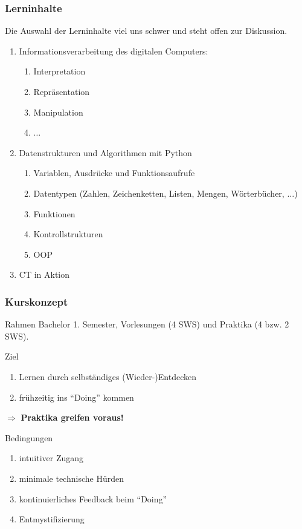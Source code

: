 \documentclass[german,aspectratio=169]{beamer}
\begin{document}
\begin{frame}
	\frametitle{Lerninhalte}
	Die Auswahl der Lerninhalte viel uns schwer und steht offen zur Diskussion.
	\begin{enumerate}[label=(\arabic*)]
		\item Informationsverarbeitung des digitalen Computers: 
		\begin{enumerate}[label=$\bullet$]
			\item Interpretation
			\item Repräsentation
			\item Manipulation
			\item $\ldots$
		\end{enumerate}
		\item Datenstrukturen und Algorithmen mit Python
			\begin{enumerate}[label=$\bullet$]
			\item Variablen, Ausdrücke und Funktionsaufrufe
			\item Datentypen (Zahlen, Zeichenketten, Listen, Mengen, Wörterbücher, $\ldots$)
			\item Funktionen
			\item Kontrollstrukturen
			\item OOP
		\end{enumerate}
		\item CT in Aktion
	\end{enumerate}
\end{frame}

\begin{frame}
	\frametitle{Kurskonzept}
	\begin{block}{Rahmen}
		Bachelor 1. Semester, Vorlesungen (4 SWS) und Praktika (4 bzw. 2 SWS).
	\end{block}
	\begin{block}{Ziel}
		\begin{enumerate}[label = $\bullet$]
			\item Lernen durch selbständiges (Wieder-)Entdecken
			\item frühzeitig ins ``Doing'' kommen
		\end{enumerate}
	 $\Rightarrow$ \textbf{Praktika greifen voraus!}
	\end{block}
	\begin{block}{Bedingungen}
		\begin{enumerate}[label = $\bullet$]
			\item intuitiver Zugang
			\item minimale technische Hürden
			\item kontinuierliches Feedback beim ``Doing''
			\item Ent­mys­ti­fi­zie­rung
		\end{enumerate}
	\end{block}
\end{frame}
\end{document}
